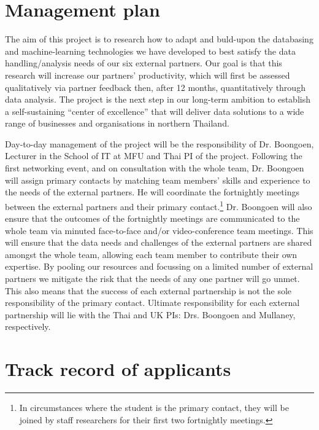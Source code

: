 \documentclass[11pt]{article}
\begin{document}

\section{Management plan}
The aim of this project is to research how to adapt and buld-upon the databasing and machine-learning technologies we have developed to best satisfy the data handling/analysis needs of our six external partners. Our goal is that this research will increase our partners' productivity, which will first be assessed qualitatively via partner feedback then, after 12 months, quantitatively through data analysis. The project is the next step in our long-term ambition to establish a self-sustaining ``center of excellence'' that will deliver data solutions to a wide range of businesses and organisations in northern Thailand.

\vspace{2mm}
\noindent
Day-to-day management of the project will be the responsibility of Dr. Boongoen, Lecturer in the School of IT at MFU and Thai PI of the project. Following the first networking event, and on consultation with the whole team, Dr. Boongoen will assign primary contacts by matching team members' skills and experience to the needs of the external partners. He will coordinate the fortnightly meetings between the external partners and their primary contact.\footnote{In circumstances where the student is the primary contact, they will be joined by staff researchers for their first two fortnightly meetings.} Dr. Boongoen will also ensure that the outcomes of the fortnightly meetings are communicated to the whole team via minuted face-to-face and/or video-conference team meetings. This will ensure that the data needs and challenges of the external partners are shared amongst the whole team, allowing each team member to contribute their own expertise. By pooling our resources and focussing on a limited number of external partners we mitigate the risk that the needs of any one partner will go unmet. This also means that the success of each external partnership is not the sole responsibility of the primary contact. Ultimate responsibility for each external partnership will lie with the Thai and UK PIs: Drs. Boongoen and Mullaney, respectively. 

\section{Track record of applicants}
\end{document}

